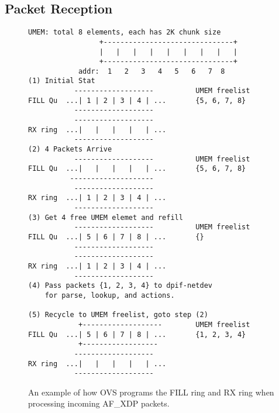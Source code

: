 \documentclass[10pt]{sigplanconf}
\begin{document}
\subsection{Packet Reception}
\begin{figure}
{\scriptsize
\begin{verbatim}
UMEM: total 8 elements, each has 2K chunk size
                 +-------------------------------+
                 |   |   |   |   |   |   |   |   |
                 +-------------------------------+
            addr:  1   2   3   4   5   6   7  8 
(1) Initial Stat
           -------------------          UMEM freelist
FILL Qu  ...| 1 | 2 | 3 | 4 | ...       {5, 6, 7, 8}
           -------------------
           -------------------
RX ring  ...|   |   |   |   | ...
           -------------------
(2) 4 Packets Arrive
           -------------------          UMEM freelist
FILL Qu  ...|   |   |   |   | ...       {5, 6, 7, 8}
          --------------------
           -------------------
RX ring  ...| 1 | 2 | 3 | 4 | ...
           -------------------
(3) Get 4 free UMEM elemet and refill
           -------------------          UMEM freelist
FILL Qu  ...| 5 | 6 | 7 | 8 | ...       {} 
           -------------------
           -------------------
RX ring  ...| 1 | 2 | 3 | 4 | ...
           -------------------
(4) Pass packets {1, 2, 3, 4} to dpif-netdev
    for parse, lookup, and actions.

(5) Recycle to UMEM freelist, goto step (2)
            +-------------------        UMEM freelist
FILL Qu  ...| 5 | 6 | 7 | 8 | ...       {1, 2, 3, 4}
            +------------------
           -------------------
RX ring  ...|   |   |   |   | ...
           -------------------
\end{verbatim}
}
\vspace{-1.0em}
\caption{An example of how OVS programs the FILL ring and RX ring when
processing incoming AF\_XDP packets.}
\label{afxdprx}
\vspace{-1.0em}
\end{figure}
\end{document}
